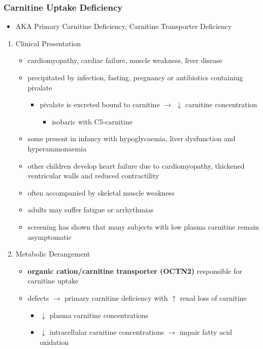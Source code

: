 \documentclass[12pt]{scrartcl}
\begin{document}
\subsubsection{Carnitine Uptake Deficiency}
\label{sec:orgf08b617}
\begin{itemize}
\item AKA Primary Carnitine Deficiency, Carnitine Transporter Deficiency
\end{itemize}
\begin{enumerate}
\item Clinical Presentation
\label{sec:orgbc112d3}
\begin{itemize}
\item cardiomyopathy, cardiac failure, muscle weakness, liver disease
\item precipitated by infection, fasting, pregnancy or antibiotics containing pivalate
\begin{itemize}
\item pivalate is excreted bound to carnitine \(\to\) \(\downarrow\) carnitine concentration
\begin{itemize}
\item isobaric with C5-carnitine
\end{itemize}
\end{itemize}
\item some present in infancy with hypoglycaemia, liver dysfunction and hyperammonaemia
\item other children develop heart failure due to cardiomyopathy,
thickened ventricular walls and reduced contractility
\item often accompanied by skeletal muscle weakness
\item adults may suffer fatigue or arrhythmias
\item screening has shown that many subjects with low plasma carnitine remain asymptomatic
\end{itemize}
\item Metabolic Derangement
\label{sec:orgece5ab8}
\begin{itemize}
\item \textbf{organic cation/carnitine transporter (OCTN2)} responsible for
carnitine uptake
\item defects \(\to\) primary carnitine deficiency with \(\uparrow\) renal loss of carnitine
\begin{itemize}
\item \(\downarrow\) plasma carnitine concentrations
\item \(\downarrow\) intracellular carnitine concentrations \(\to\) impair fatty acid
oxidation
\end{itemize}
\end{itemize}


\end{enumerate}
\end{document}

